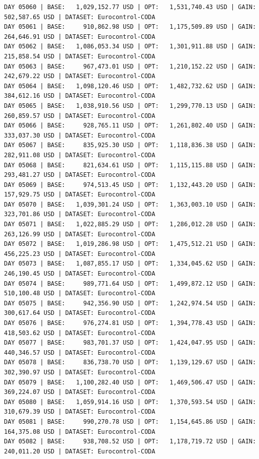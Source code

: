 \documentclass[11pt,a4paper]{article}
\begin{document}
\begin{verbatim}
DAY 05060 | BASE:   1,029,152.77 USD | OPT:   1,531,740.43 USD | GAIN: 502,587.65 USD | DATASET: Eurocontrol-CODA
DAY 05061 | BASE:     910,862.98 USD | OPT:   1,175,509.89 USD | GAIN: 264,646.91 USD | DATASET: Eurocontrol-CODA
DAY 05062 | BASE:   1,086,053.34 USD | OPT:   1,301,911.88 USD | GAIN: 215,858.54 USD | DATASET: Eurocontrol-CODA
DAY 05063 | BASE:     967,473.01 USD | OPT:   1,210,152.22 USD | GAIN: 242,679.22 USD | DATASET: Eurocontrol-CODA
DAY 05064 | BASE:   1,098,120.46 USD | OPT:   1,482,732.62 USD | GAIN: 384,612.16 USD | DATASET: Eurocontrol-CODA
DAY 05065 | BASE:   1,038,910.56 USD | OPT:   1,299,770.13 USD | GAIN: 260,859.57 USD | DATASET: Eurocontrol-CODA
DAY 05066 | BASE:     928,765.11 USD | OPT:   1,261,802.40 USD | GAIN: 333,037.30 USD | DATASET: Eurocontrol-CODA
DAY 05067 | BASE:     835,925.30 USD | OPT:   1,118,836.38 USD | GAIN: 282,911.08 USD | DATASET: Eurocontrol-CODA
DAY 05068 | BASE:     821,634.61 USD | OPT:   1,115,115.88 USD | GAIN: 293,481.27 USD | DATASET: Eurocontrol-CODA
DAY 05069 | BASE:     974,513.45 USD | OPT:   1,132,443.20 USD | GAIN: 157,929.75 USD | DATASET: Eurocontrol-CODA
DAY 05070 | BASE:   1,039,301.24 USD | OPT:   1,363,003.10 USD | GAIN: 323,701.86 USD | DATASET: Eurocontrol-CODA
DAY 05071 | BASE:   1,022,885.29 USD | OPT:   1,286,012.28 USD | GAIN: 263,126.99 USD | DATASET: Eurocontrol-CODA
DAY 05072 | BASE:   1,019,286.98 USD | OPT:   1,475,512.21 USD | GAIN: 456,225.23 USD | DATASET: Eurocontrol-CODA
DAY 05073 | BASE:   1,087,855.17 USD | OPT:   1,334,045.62 USD | GAIN: 246,190.45 USD | DATASET: Eurocontrol-CODA
DAY 05074 | BASE:     989,771.64 USD | OPT:   1,499,872.12 USD | GAIN: 510,100.48 USD | DATASET: Eurocontrol-CODA
DAY 05075 | BASE:     942,356.90 USD | OPT:   1,242,974.54 USD | GAIN: 300,617.64 USD | DATASET: Eurocontrol-CODA
DAY 05076 | BASE:     976,274.81 USD | OPT:   1,394,778.43 USD | GAIN: 418,503.62 USD | DATASET: Eurocontrol-CODA
DAY 05077 | BASE:     983,701.37 USD | OPT:   1,424,047.95 USD | GAIN: 440,346.57 USD | DATASET: Eurocontrol-CODA
DAY 05078 | BASE:     836,738.70 USD | OPT:   1,139,129.67 USD | GAIN: 302,390.97 USD | DATASET: Eurocontrol-CODA
DAY 05079 | BASE:   1,100,282.40 USD | OPT:   1,469,506.47 USD | GAIN: 369,224.07 USD | DATASET: Eurocontrol-CODA
DAY 05080 | BASE:   1,059,914.16 USD | OPT:   1,370,593.54 USD | GAIN: 310,679.39 USD | DATASET: Eurocontrol-CODA
DAY 05081 | BASE:     990,270.78 USD | OPT:   1,154,645.86 USD | GAIN: 164,375.08 USD | DATASET: Eurocontrol-CODA
DAY 05082 | BASE:     938,708.52 USD | OPT:   1,178,719.72 USD | GAIN: 240,011.20 USD | DATASET: Eurocontrol-CODA

\end{verbatim}
\end{document}
